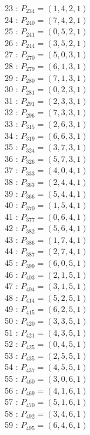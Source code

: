 \documentclass{article}
\begin{document}
{\begin{multicols}{3}
23 : $P_{234}=( 1, 4, 2, 1 )$\\
24 : $P_{240}=( 7, 4, 2, 1 )$\\
25 : $P_{241}=( 0, 5, 2, 1 )$\\
26 : $P_{244}=( 3, 5, 2, 1 )$\\
27 : $P_{270}=( 5, 0, 3, 1 )$\\
28 : $P_{279}=( 6, 1, 3, 1 )$\\
29 : $P_{280}=( 7, 1, 3, 1 )$\\
30 : $P_{281}=( 0, 2, 3, 1 )$\\
31 : $P_{291}=( 2, 3, 3, 1 )$\\
32 : $P_{296}=( 7, 3, 3, 1 )$\\
33 : $P_{315}=( 2, 6, 3, 1 )$\\
34 : $P_{319}=( 6, 6, 3, 1 )$\\
35 : $P_{324}=( 3, 7, 3, 1 )$\\
36 : $P_{326}=( 5, 7, 3, 1 )$\\
37 : $P_{333}=( 4, 0, 4, 1 )$\\
38 : $P_{363}=( 2, 4, 4, 1 )$\\
39 : $P_{366}=( 5, 4, 4, 1 )$\\
40 : $P_{370}=( 1, 5, 4, 1 )$\\
41 : $P_{377}=( 0, 6, 4, 1 )$\\
42 : $P_{382}=( 5, 6, 4, 1 )$\\
43 : $P_{386}=( 1, 7, 4, 1 )$\\
44 : $P_{387}=( 2, 7, 4, 1 )$\\
45 : $P_{399}=( 6, 0, 5, 1 )$\\
46 : $P_{403}=( 2, 1, 5, 1 )$\\
47 : $P_{404}=( 3, 1, 5, 1 )$\\
48 : $P_{414}=( 5, 2, 5, 1 )$\\
49 : $P_{415}=( 6, 2, 5, 1 )$\\
50 : $P_{420}=( 3, 3, 5, 1 )$\\
51 : $P_{421}=( 4, 3, 5, 1 )$\\
52 : $P_{425}=( 0, 4, 5, 1 )$\\
53 : $P_{435}=( 2, 5, 5, 1 )$\\
54 : $P_{437}=( 4, 5, 5, 1 )$\\
55 : $P_{460}=( 3, 0, 6, 1 )$\\
56 : $P_{469}=( 4, 1, 6, 1 )$\\
57 : $P_{470}=( 5, 1, 6, 1 )$\\
58 : $P_{492}=( 3, 4, 6, 1 )$\\
59 : $P_{495}=( 6, 4, 6, 1 )$\\

\end{multicols}}
\end{document}
